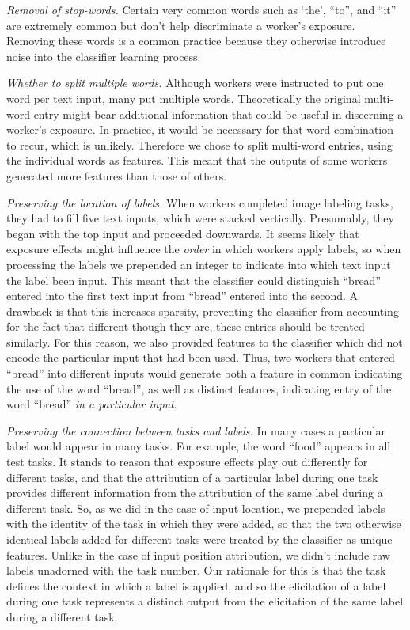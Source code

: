 \documentclass[12pt]{article}
\begin{document}
	\textit{Removal of stop-words.}  Certain very common words such as `the',
	``to'', and ``it'' are extremely common but don't help discriminate a 
	worker's exposure.  Removing these words is a common practice because
	they otherwise introduce noise into the classifier learning process.

	\textit{Whether to split multiple words.}  Although workers were 
	instructed to put one word per text input, many put multiple words.
	Theoretically the original multi-word entry might bear additional 
	information that could be useful in discerning a worker's exposure. 
	In practice, it would be necessary for that word combination to recur,
	which is unlikely.  Therefore we chose to split multi-word entries,
	using the individual words as features.  This meant that the outputs of
	some workers generated more features than those of others.

	\textit{Preserving the location of labels.}  When workers completed image
	labeling tasks, they had to fill five text inputs, which were stacked
	vertically.  Presumably, they began with the top input and proceeded 
	downwards.  It seems likely that exposure effects might influence the
	\textit{order} in which workers apply labels, so when processing the 
	labels we prepended an integer to indicate into which text input the 
	label been input.  This meant that the classifier could distinguish
	``bread'' entered into the first text input from ``bread'' entered into
	the second.  A drawback is that this increases sparsity, preventing the
	classifier from accounting for the fact that different though they are,
	these entries should be treated similarly.  For this reason, we also
	provided features to the classifier which did not encode the particular
	input that had been used.  Thus, two workers that entered ``bread''
	into different inputs would generate both a feature in common indicating
	the use of the word ``bread'', as well as distinct features, indicating
	entry of the word ``bread'' \textit{in a particular input}.

	\textit{Preserving the connection between tasks and labels.}  In many
	cases a particular label would appear in many tasks.  For example, the
	word ``food'' appears in all test tasks.  It stands to reason that
	exposure effects play out differently for different tasks, and that
	the attribution of a particular label during one task provides different
	information from the attribution of the same label during a different 
	task.  So, as we did in the case of input location, we prepended labels
	with the identity of the task in which they were added, so that the 
	two otherwise identical labels added for different tasks were treated
	by the classifier as unique features.  Unlike in the case of input 
	position attribution, we didn't include raw labels unadorned with 
	the task number.  Our rationale for this is that the task defines the 
	context in which a label is applied, and so the elicitation of a label 
	during one task represents a distinct output from the elicitation of the 
	same label during a different task.  
\end{document}
